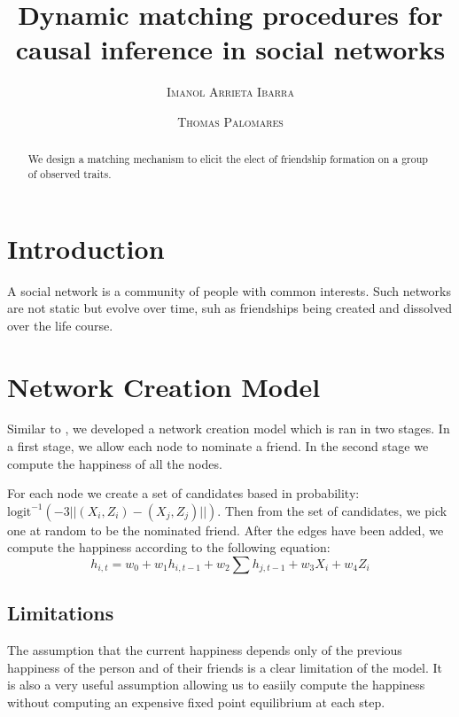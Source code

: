 \documentclass[11pt]{article}
\title{Dynamic matching procedures for causal inference in social networks}
\author{{\textsc{Imanol Arrieta Ibarra}} \\
 \and {\textsc{Thomas Palomares}} \\
}
\begin{document}
\maketitle


\begin{abstract}
We design a matching mechanism to elicit the elect of friendship formation on a group of observed traits.
\end{abstract}

\newpage

\section{Introduction}

A social network is a community of people with common interests. Such networks are not static but evolve over time, suh as friendships being created and dissolved over the life course. 

\section{Network Creation Model}

Similar to \cite{christakis2007spread}, we developed a network creation model which is ran in two stages. In a first stage, we allow each node to nominate a friend. In the second stage we compute the happiness of all the nodes.

For each node we create a set of candidates based in probability: $\text{logit}^{-1} \left(-3||(X_i,Z_i)-(X_j,Z_j)||\right)$. Then from the set of candidates, we pick one at random to be the nominated friend. After the edges have been added, we compute the happiness according to the following equation:
$$h_{i,t} = w_0 +w_1 h_{i,t-1} + w_2\sum\limits h_{j,t-1} + w_3 X_{i} + w_4 Z_{i}$$

\subsection{Limitations}

The assumption that the current happiness depends only of the previous happiness of the person and of their friends is a clear limitation of the model. It is also a very useful assumption allowing us to easiily compute the happiness without computing an expensive fixed point equilibrium at each step.




\end{document}
